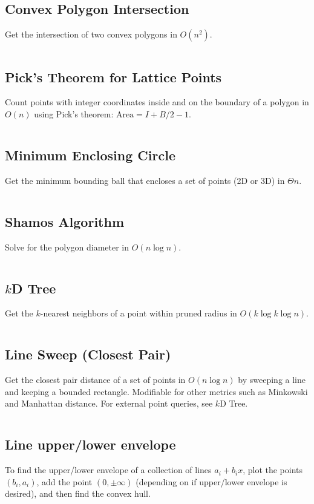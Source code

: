 \documentclass[8pt,a4paper,landscape,oneside]{amsart}
\newcommand{\code}[1]{\inputminted[fontsize=\normalsize,baselinestretch=1]{cpp}{_code/#1}}
\begin{document}
\begin{multicols*}{3}
  \subsection{Convex Polygon Intersection}
    Get the intersection of two convex polygons in $O(n^2)$.
    \code{geom/convex-poly-isect.cpp}
  \subsection{Pick's Theorem for Lattice Points}
    Count points with integer coordinates inside and on the boundary of a polygon in
    $O(n)$ using Pick's theorem: $\text{Area} = I + B/2 - 1$.
    \code{geom/picks.cpp}
  \subsection{Minimum Enclosing Circle}
    Get the minimum bounding ball that encloses a set of points (2D or 3D) in $\Theta{n}$.
    \code{geom/min-enclosing-circ.cpp}
  \subsection{Shamos Algorithm}
    Solve for the polygon diameter in $O(n \log n)$.
    \code{geom/shamos.cpp}
  \subsection{$k$D Tree}
    Get the $k$-nearest neighbors of a point within pruned radius in $O(k \log k \log n)$.
    \code{geom/kd-tree.cpp}
  \subsection{Line Sweep (Closest Pair)}
    Get the closest pair distance of a set of points in $O(n \log n)$ by sweeping a line and
    keeping a bounded rectangle. Modifiable for other metrics such as Minkowski and
    Manhattan distance. For external point queries, see $k$D Tree.
    \code{geom/closest-pair.cpp}
  \subsection{Line upper/lower envelope}
    To find the upper/lower envelope of a collection of lines $a_i+b_i x$,
    plot the points $(b_i,a_i)$, add the point $(0,\pm \infty)$ (depending
    on if upper/lower envelope is desired), and then find the convex hull.

\end{multicols*}
\end{document}
